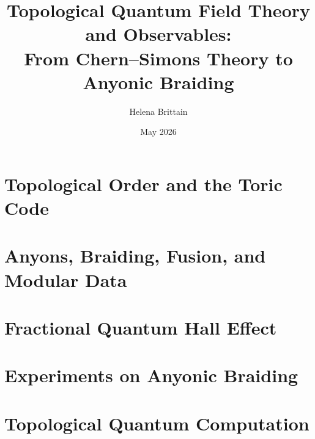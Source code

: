 \documentclass[11pt]{report}
\title{Topological Quantum Field Theory and Observables:\\
From Chern--Simons Theory to Anyonic Braiding}
\author{Helena Brittain}
\date{May 2026}
\begin{document}
\maketitle
\tableofcontents












\chapter{Topological Order and the Toric Code}\label{ch:topological-order}


\chapter{Anyons, Braiding, Fusion, and Modular Data}\label{ch:anyons}


\chapter{Fractional Quantum Hall Effect}\label{ch:fqhe}


\chapter{Experiments on Anyonic Braiding}\label{ch:experiments}


\chapter{Topological Quantum Computation}\label{ch:tqc}

\end{document}
